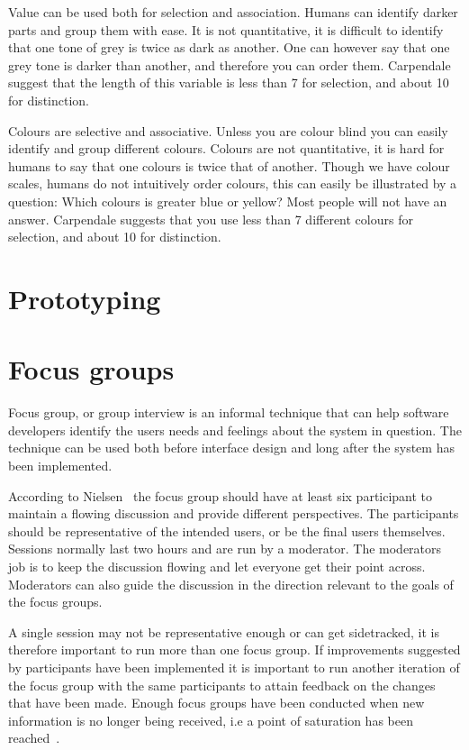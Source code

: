 Value can be used both for selection and association. Humans can identify darker parts and group them with ease. It is not quantitative, it is difficult to identify that one tone of grey is twice as dark as another. One can however say that one grey tone is darker than another, and therefore you can order them. Carpendale suggest that the length of this variable is less than 7 for selection, and about 10 for distinction.

Colours are selective and associative. Unless you are colour blind you can easily identify and group different colours. Colours are not quantitative, it is hard for humans to say that one colours is twice that of another. Though we have colour scales, humans do not intuitively order colours, this can easily be illustrated by a question: Which colours is greater blue or yellow? Most people will not have an answer. Carpendale suggests that you use less than 7 different colours for selection, and about 10 for distinction.

\section{Prototyping}

\section{Focus groups}
Focus group, or group interview is an informal technique that can help software developers identify the users needs and feelings about the system in question. The technique can be used both before interface design and long after the system has been implemented. 

According to Nielsen~\cite{focusGroup} the focus group should have at least six participant to maintain a flowing discussion and provide different perspectives. The participants should be representative of the intended users, or be the final users themselves. Sessions normally last two hours and are run by a moderator. The moderators job is to keep the discussion flowing and let everyone get their point across. Moderators can also guide the discussion in the direction relevant to the goals of the focus groups. 

A single session may not be representative enough or can get sidetracked, it is therefore important to run more than one focus group. If improvements suggested by participants have been implemented it is important to run another iteration of the focus group with the same participants to attain feedback on the changes that have been made. Enough focus groups have been conducted when new information is no longer being received, i.e a point of saturation has been reached~\cite{howFocusGroup}. 

